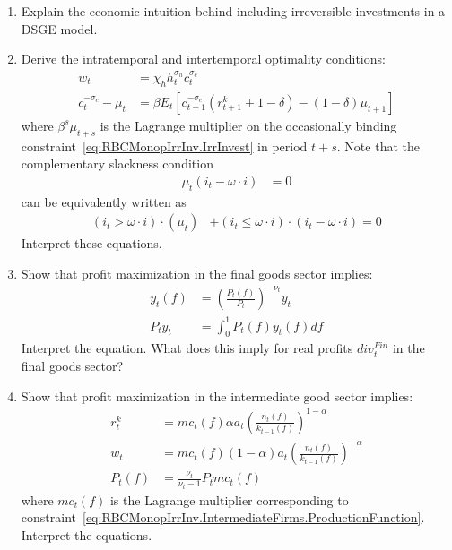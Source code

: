 \documentclass[a4paper]{scrartcl}
\begin{document}
\begin{enumerate}

\item
Explain the economic intuition behind including irreversible investments in a DSGE model.

\item
Derive the intratemporal and intertemporal optimality conditions:
\begin{align}
w_t &= \chi_h h_t^{\sigma_h} c_t^{\sigma_c} \label{eq:RBCMonopIrrInv.LaborSupply}
\\
c_t^{-\sigma_c} - \mu_t &= \beta E_t \left[ c_{t+1}^{-\sigma_c} \left( r^k_{t+1} + 1-\delta \right) - (1-\delta) \mu_{t+1}\right]
\label{eq:RBCMonopIrrInv.EulerCapital}
\end{align}
where \(\beta^s \mu_{t+s}\) is the Lagrange multiplier on the occasionally binding constraint~\eqref{eq:RBCMonopIrrInv.IrrInvest} in period \(t+s\).
Note that the complementary slackness condition
\begin{align*}
\mu_t (i_t - \omega \cdot i) &= 0
\end{align*}
can be equivalently written as
\begin{align}
(i_t > \omega \cdot i) \cdot (\mu_t) &+ (i_t \leq \omega \cdot i) \cdot (i_t - \omega \cdot i) = 0  \label{eq:RBCMonopIrrInv.KuhnTuckerInvestment}
\end{align}
Interpret these equations.

\item
Show that profit maximization in the final goods sector implies:
\begin{align}
y_t(f) &= {\left(\frac{P_t(f)}{P_t}\right)}^{-\nu_t} y_t \label{eq:RBCMonopIrrInv.Firms.Demand}
\\
P_t y_t &= \int_{0}^{1} P_t(f) y_t(f) df \label{eq:RBCMonopIrrInv.Firms.ZeroProfit}
\end{align}
Interpret the equation.
What does this imply for real profits \(div_t^{Fin}\) in the final goods sector?

\item
Show that profit maximization in the intermediate good sector implies:
\begin{align}
r^k_t &= mc_t(f) \alpha a_t {\left( \frac{n_t(f)}{k_{t-1}(f)}\right)}^{1-\alpha}
\label{eq:RBCMonopIrrInv.IntermediateFirms.CapitalDemand}
\\
w_t &= mc_t(f) (1-\alpha) a_t {\left(\frac{n_t(f)}{k_{t-1}(f)}\right)}^{-\alpha}
\label{eq:RBCMonopIrrInv.IntermediateFirms.LaborDemand}
\\
P_t(f) &= \frac{\nu_t}{\nu_t - 1} P_t mc_t(f) \label{eq:RBCMonopIrrInv.IntermediateFirms.Price}
\end{align}
where \(mc_t(f)\) is the Lagrange multiplier corresponding to constraint~\eqref{eq:RBCMonopIrrInv.IntermediateFirms.ProductionFunction}.
Interpret the equations.


\end{enumerate}
\end{document}
